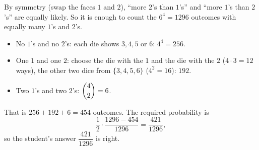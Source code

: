 By symmetry (swap the faces $1$ and $2$), ``more $2$'s than $1$'s'' and ``more $1$'s than $2$'s'' are equally likely. So it is enough to count the $6^4=1296$ outcomes with equally many $1$'s and $2$'s.
\begin{itemize}
\item No $1$'s and no $2$'s: each die shows $3,4,5$ or $6$: $4^4=256$.
\item One $1$ and one $2$: choose the die with the $1$ and the die with the $2$ ($4\cdot3=12$ ways), the other two dice from $\{3,4,5,6\}$ ($4^2=16$): $192$.
\item Two $1$'s and two $2$'s: $\dbinom42=6$.
\end{itemize}
That is $256+192+6=454$ outcomes. The required probability is
\[
\dfrac{1}{2}\cdot\dfrac{1296-454}{1296}=\dfrac{421}{1296},
\]
so the student's answer $\boxed{\dfrac{421}{1296}}$ is right.
